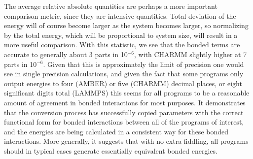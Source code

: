 The average relative absolute quantities are perhaps a more important
comparison metric, since they are intensive quantities.  Total
deviation of the energy will of course become larger as the system
becomes larger, so normalizing by the total energy, which will be
proportional to system size, will result in a more useful comparison.
With this statistic, we see that the bonded terms are accurate to
generally about 3 parts in 10$^{-6}$, with CHARMM slightly higher at 7
parts in 10$^{-6}$. Given that this is approximately the limit of
precision one would see in single precision calculations, and given
the fact that some programs only output energies to four (AMBER) or
five (CHARMM) decimal places, or eight significant digits total
(LAMMPS) this seems for all programs to be a reasonable amount of
agreement in bonded interactions for most purposes. It demonstrates
that the conversion process has successfully copied parameters with
the correct functional form for bonded interactions between all of the
programs of interest, and the energies are being calculated in a
consistent way for these bonded interactions.  More generally, it
suggests that with no extra fiddling, all programs should in typical
cases generate essentially equivalent bonded energies.

